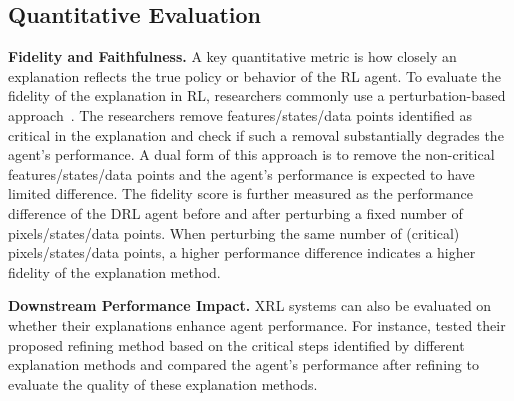 \subsection{Quantitative Evaluation}
\textbf{Fidelity and Faithfulness.}
A key quantitative metric is how closely an explanation reflects the true policy or behavior of the RL agent. To evaluate the fidelity of the explanation in RL, researchers commonly use a perturbation-based approach~\citep{guo2021edge,cheng2023statemask}. The researchers remove features/states/data points identified as critical in the explanation and check if such a removal substantially degrades the agent’s performance. A dual form of this approach is to remove the non-critical features/states/data points and the agent's performance is expected to have limited difference. The fidelity score is further measured as the performance difference of the DRL agent before and after perturbing a fixed number of pixels/states/data points. When perturbing the same number of (critical) pixels/states/data points, a higher performance difference indicates a higher fidelity of the explanation method.


\textbf{Downstream Performance Impact.}
XRL systems can also be evaluated on whether their explanations enhance agent performance. For instance, \citet{chengrice} tested their proposed refining method based on the critical steps identified by different explanation methods and compared the agent’s performance after refining to evaluate the quality of these explanation methods.